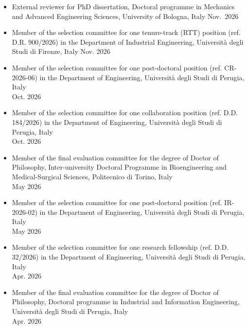 \documentclass[11pt]{article}
\begin{document}
\begin{itemize}

		\item External reviewer for PhD dissertation, Doctoral programme in Mechanics and Advanced Engineering Sciences, University of Bologna,  Italy \mbox{} \hfill Nov.~2026

		\item	Member of the selection committee for one tenure-track (RTT) position (ref. D.R. 900/2026) in the Department of Industrial Engineering, Università degli Studi di Firenze, Italy \mbox{} \hfill  Nov. 2026

		\item Member of the selection committee for one post-doctoral position (ref. CR-2026-06) in the Department of Engineering, Università degli Studi di Perugia, Italy \\ \mbox{} \hfill Oct. 2026
		
		\item Member of the selection committee for one collaboration position (ref. D.D. 184/2026) in the Department of Engineering, Università degli Studi di Perugia, Italy \\ \mbox{} \hfill Oct. 2026
		
		\item Member of the final evaluation committee for the degree of Doctor of Philosophy, Inter-university Doctoral Programme in Bioengineering and Medical-Surgical Sciences, Politecnico di Torino, Italy \\ \mbox{} \hfill May 2026

\item Member of the selection committee for one post-doctoral position (ref. IR-2026-02) in the Department of Engineering, Università degli Studi di Perugia, Italy \\ \mbox{} \hfill May 2026

		\item	Member of the selection committee for one research fellowship (ref. D.D. 32/2026) in the Department of Engineering, Università degli Studi di Perugia, Italy\\ \mbox{} \hfill Apr. 2026		
	
		\item Member of the final evaluation committee for the degree of Doctor of Philosophy, Doctoral programme in Industrial and Information Engineering, Università degli Studi di Perugia, Italy \\ \mbox{} \hfill  Apr. 2026
		

\end{itemize}
\end{document}
